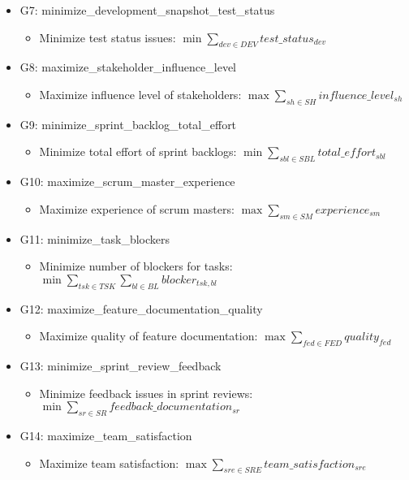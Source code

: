 \documentclass{article}
\begin{document}
\begin{itemize}
\begin{itemize}
        \end{itemize}
    \item G7: minimize\_development\_snapshot\_test\_status
        \begin{itemize}
            \item Minimize test status issues: $\min \sum_{dev \in DEV} test\_status_{dev}$
        \end{itemize}
    \item G8: maximize\_stakeholder\_influence\_level
        \begin{itemize}
            \item Maximize influence level of stakeholders: $\max \sum_{sh \in SH} influence\_level_{sh}$
        \end{itemize}
    \item G9: minimize\_sprint\_backlog\_total\_effort
        \begin{itemize}
            \item Minimize total effort of sprint backlogs: $\min \sum_{sbl \in SBL} total\_effort_{sbl}$
        \end{itemize}
    \item G10: maximize\_scrum\_master\_experience
        \begin{itemize}
            \item Maximize experience of scrum masters: $\max \sum_{sm \in SM} experience_{sm}$
        \end{itemize}
    \item G11: minimize\_task\_blockers
        \begin{itemize}
            \item Minimize number of blockers for tasks: $\min \sum_{tsk \in TSK} \sum_{bl \in BL} blocker_{tsk,bl}$
        \end{itemize}
    \item G12: maximize\_feature\_documentation\_quality
        \begin{itemize}
            \item Maximize quality of feature documentation: $\max \sum_{fed \in FED} quality_{fed}$
        \end{itemize}
    \item G13: minimize\_sprint\_review\_feedback
        \begin{itemize}
            \item Minimize feedback issues in sprint reviews: $\min \sum_{sr \in SR} feedback\_documentation_{sr}$
        \end{itemize}
    \item G14: maximize\_team\_satisfaction
        \begin{itemize}
            \item Maximize team satisfaction: $\max \sum_{sre \in SRE} team\_satisfaction_{sre}$
        \end{itemize}
\end{itemize}
\end{document}
